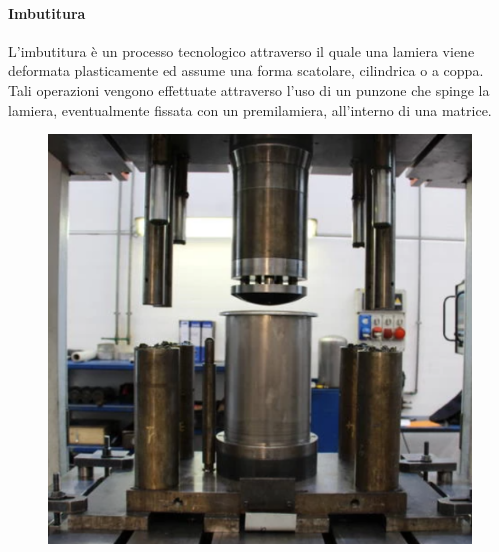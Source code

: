 \paragraph{Imbutitura} L'imbutitura è un processo tecnologico attraverso il quale una lamiera viene deformata plasticamente ed assume una forma scatolare, cilindrica o a coppa.\\
Tali operazioni vengono effettuate attraverso l'uso di un punzone che spinge la lamiera, eventualmente fissata con un premilamiera, all'interno di una matrice.
\begin{figure}[h]
    \centering
    \includegraphics[scale=0.2]{Immagini/Imbutitura1.png}

\end{figure}
